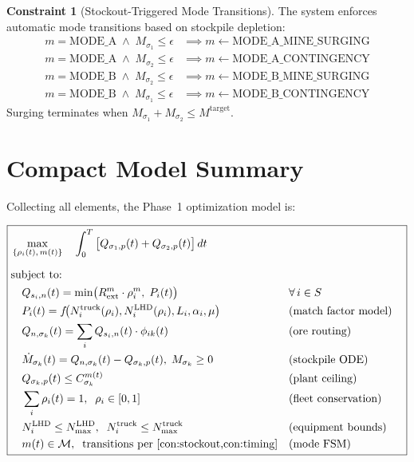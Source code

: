 \documentclass[11pt,a4paper]{article}
\theoremstyle{definition}
\newtheorem{constraint}{Constraint}[section]
\begin{document}
\begin{constraint}[Stockout-Triggered Mode Transitions]
\label{con:stockout}
The system enforces automatic mode transitions based on stockpile depletion:
\begin{align}
  m = \text{MODE\_A} \;\wedge\; M_{\sigma_1} \leq \epsilon &\implies m \gets \text{MODE\_A\_MINE\_SURGING} \\
  m = \text{MODE\_A} \;\wedge\; M_{\sigma_2} \leq \epsilon &\implies m \gets \text{MODE\_A\_CONTINGENCY} \\
  m = \text{MODE\_B} \;\wedge\; M_{\sigma_2} \leq \epsilon &\implies m \gets \text{MODE\_B\_MINE\_SURGING} \\
  m = \text{MODE\_B} \;\wedge\; M_{\sigma_1} \leq \epsilon &\implies m \gets \text{MODE\_B\_CONTINGENCY}
\end{align}
Surging terminates when $M_{\sigma_1} + M_{\sigma_2} \leq M^{\text{target}}$.
\end{constraint}


\section{Compact Model Summary}
\label{sec:compact}

Collecting all elements, the Phase~1 optimization model is:

\begin{equation*}
\boxed{
\begin{aligned}
  &\max_{\{\rho_i(t),\, m(t)\}} \quad
    \int_0^T \big[Q_{\sigma_1,p}(t) + Q_{\sigma_2,p}(t)\big]\, dt \\[6pt]
  &\text{subject to:} \\
  &\quad Q_{s_i,n}(t) = \min\!\big(R^{m}_{\text{ext}} \cdot \rho_i^m,\; P_i(t)\big)
    && \forall\, i \in S \\
  &\quad P_i(t) = f\!\big(N_i^{\text{truck}}(\rho_i), N_i^{\text{LHD}}(\rho_i), L_i, \alpha_i, \mu\big)
    && \text{(match factor model)} \\
  &\quad Q_{n,\sigma_k}(t) = \sum_{i} Q_{s_i,n}(t) \cdot \phi_{ik}(t)
    && \text{(ore routing)} \\
  &\quad \dot{M}_{\sigma_k}(t) = Q_{n,\sigma_k}(t) - Q_{\sigma_k,p}(t),
    \; M_{\sigma_k} \geq 0
    && \text{(stockpile ODE)} \\
  &\quad Q_{\sigma_k,p}(t) \leq C^{m(t)}_{\sigma_k}
    && \text{(plant ceiling)} \\
  &\quad \sum_i \rho_i(t) = 1, \;\; \rho_i \in [0,1]
    && \text{(fleet conservation)} \\
  &\quad N_i^{\text{LHD}} \leq N^{\text{LHD}}_{\max}, \;\;
         N_i^{\text{truck}} \leq N^{\text{truck}}_{\max}
    && \text{(equipment bounds)} \\
  &\quad m(t) \in \mathcal{M}, \;\; \text{transitions per } \cref{con:stockout,con:timing}
    && \text{(mode FSM)}
\end{aligned}
}
\end{equation*}
\end{document}
